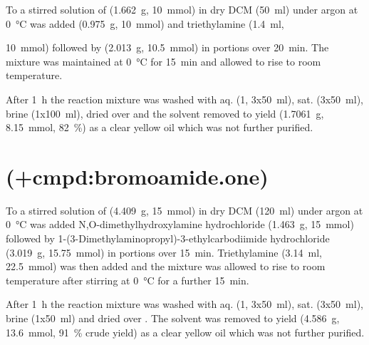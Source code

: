 To a stirred solution of  (\SI{1.662}{\gram}, \SI{10}{\milli\mol}) in dry DCM (\SI{50}{\milli\litre}) under argon at \SI{0}{\celsius} was added  (\SI{0.975}{\gram}, \SI{10}{\milli\mol}) and triethylamine (\SI{1.4}{\milli\litre}, {\SI{10}{\milli\mol}) followed by  (\SI{2.013}{\gram}, \SI{10.5}{\milli\mol}) in portions over \SI{20}{\minute}. The mixture was maintained at \SI{0}{\celsius} for \SI{15}{\minute} and allowed to rise to room temperature.

After \SI{1}{\hour} the reaction mixture was washed with aq.  (\SI{1}{\Molar}, 3x\SI{50}{\milli\litre}), sat.  (3x\SI{50}{\milli\litre}), brine (1x\SI{100}{\milli\litre}), dried over  and the solvent removed \invacuo to yield  (\SI{1.7061}{\gram}, \SI{8.15}{\milli\mole}, \SI{82}{\percent}) as a clear yellow oil which was not further purified.


\section{ (\cmpd+{cmpd:bromoamide.one})}

To a stirred solution of  (\SI{4.409}{\gram}, \SI{15}{\milli\mol}) in dry DCM (\SI{120}{\milli\litre}) under argon at \SI{0}{\celsius} was added N,O-dimethylhydroxylamine hydrochloride (\SI{1.463}{\gram}, \SI{15}{\milli\mol}) followed by 1-(3-Dimethylaminopropyl)-3-ethylcarbodiimide hydrochloride (\SI{3.019}{\gram}, \SI{15.75}{\milli\mol}) in portions over \SI{15}{\minute}. Triethylamine (\SI{3.14}{\milli\litre}, \SI{22.5}{\milli\mol}) was then added and the mixture was allowed to rise to room temperature after stirring at \SI{0}{\celsius} for a further \SI{15}{\minute}.

After \SI{1}{\hour} the reaction mixture was washed with aq.  (\SI{1}{\Molar}, 3x\SI{50}{\milli\litre}), sat.  (3x\SI{50}{\milli\litre}), brine (1x\SI{50}{\milli\litre}) and dried over . The solvent was removed \invacuo to yield  (\SI{4.586}{\gram}, \SI{13.6}{\milli\mol}, \SI{91}{\percent} crude yield) as a clear yellow oil which was not further purified.


}
